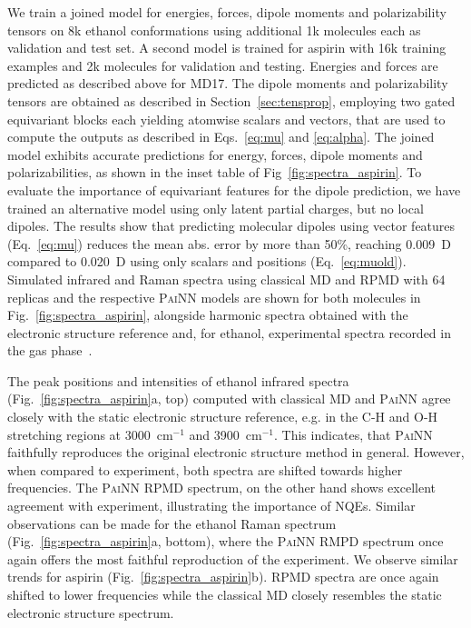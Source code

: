 \documentclass[reprint,
amsmath,amssymb,
 aip,jcp
]{revtex4-2}
\newcommand{\painn}{\textsc{PaiNN}}
\newcommand{\icm}{cm$^{-1}$}
\newcommand{\new}[1]{#1}
\begin{document}
We train a joined model for energies, forces, dipole moments and polarizability tensors on 8k ethanol conformations using additional 1k molecules each as validation and test set.
A second model is trained for aspirin with 16k training examples and 2k molecules for validation and testing.
Energies and forces are predicted as described above for MD17.
The dipole moments and polarizability tensors are obtained as described in Section~\ref{sec:tensprop}, employing two gated equivariant blocks each yielding atomwise scalars and vectors, that are used to compute the outputs as described in Eqs.~\ref{eq:mu} and \ref{eq:alpha}.
The joined model exhibits accurate predictions for energy, forces, dipole moments and polarizabilities, as shown in the inset table of Fig~\ref{fig:spectra_aspirin}.
\new{To evaluate the importance of equivariant features for the dipole prediction, we have trained an alternative model using only latent partial charges, but no local dipoles. The results show that predicting molecular dipoles using vector features (Eq.~\ref{eq:mu}) reduces the mean abs. error by more than 50\%, reaching 0.009~D compared to 0.020~D using only scalars and positions (Eq.~\ref{eq:muold}).}
Simulated infrared and Raman spectra using classical MD and RPMD with 64 replicas \new{and the respective \painn{} models} are shown for both molecules in Fig.~\ref{fig:spectra_aspirin}, alongside \new{harmonic} spectra obtained with the electronic structure reference and, for ethanol, experimental spectra recorded in the gas phase~\cite{NIST,kiefer2017simultaneous}.

The peak positions and intensities of ethanol infrared spectra (Fig.~\ref{fig:spectra_aspirin}a, top) computed with classical MD and \new{\painn{}} agree closely with the static electronic structure reference, e.g. in the C-H and O-H stretching regions at 3000~\icm{} and 3900~\icm{}.
This indicates, that \painn{} faithfully reproduces the original electronic structure method in general.
However, when compared to experiment, both spectra are shifted towards higher frequencies.
The \painn{} RPMD spectrum, on the other hand shows excellent agreement with experiment, illustrating the importance of NQEs.
Similar observations can be made for the ethanol Raman spectrum (Fig.~\ref{fig:spectra_aspirin}a, bottom), where the \painn{} RMPD spectrum once again offers the most faithful reproduction of the experiment.
We observe similar trends for aspirin (Fig.~\ref{fig:spectra_aspirin}b).
RPMD spectra are once again shifted to lower frequencies while the classical MD closely resembles the static electronic structure spectrum.
\end{document}
